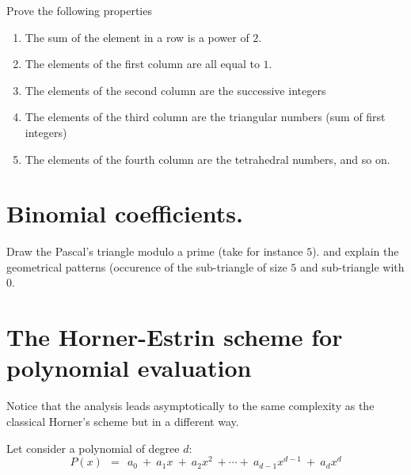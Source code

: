 \documentclass{article}[12pt]
\begin{document}
Prove the following properties

\begin{enumerate}
\item The sum of the element in a row is a power of $2$.
\item 
The elements of the first column are all equal to $1$.
\item  The elements of the second column are the successive integers
\item The elements of the third column are the triangular numbers (sum of first integers)
\item The elements of the fourth column are the tetrahedral numbers, and so on.
\end{enumerate}



\section{Binomial coefficients.}


Draw the Pascal's triangle modulo a prime (take for instance $5$).
and explain the geometrical patterns (occurence of the sub-triangle of size $5$ and sub-triangle with $0$.


\section{The Horner-Estrin scheme for polynomial evaluation}

Notice that the analysis leads asymptotically to the same complexity as the classical Horner's scheme but in a different way.
\bigskip

Let consider a polynomial of degree $d$:
\[
P(x) \ \ = \ \ a_0 \ + \ a_1 x \ + \ a_2 x^2 \ + \cdots + \ a_{d-1} x^{d-1} \ + \ a_d x^d
\]
\end{document}
